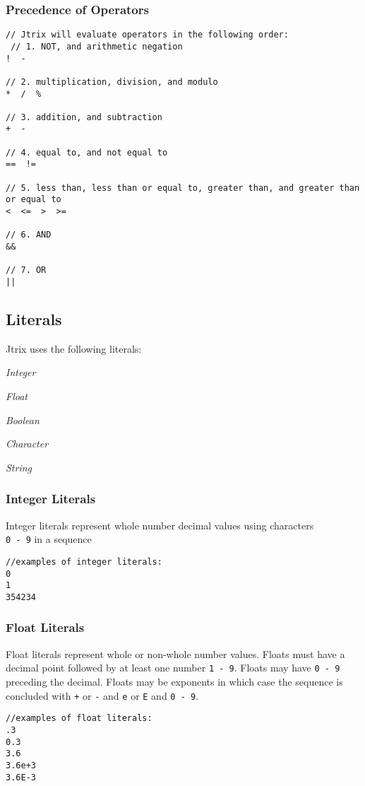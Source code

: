 \documentclass[titlepage, 12pt]{report}
\begin{document}
\subsubsection{Precedence of Operators}
\begin{lstlisting}
// Jtrix will evaluate operators in the following order:
 // 1. NOT, and arithmetic negation
!  - 

// 2. multiplication, division, and modulo
*  /  %

// 3. addition, and subtraction
+  - 

// 4. equal to, and not equal to
==  !=

// 5. less than, less than or equal to, greater than, and greater than or equal to
<  <=  >  >=

// 6. AND
&&

// 7. OR
||
\end{lstlisting}

\subsection{Literals}
Jtrix uses the following literals:

 \textit{Integer}

 \textit{Float}

 \textit{Boolean}

 \textit{Character}

 \textit{String}

\subsubsection{Integer Literals}
Integer literals represent whole number decimal values using characters \\ \texttt{0 - 9} in a sequence
\begin{lstlisting}
//examples of integer literals:
0
1
354234
\end{lstlisting}

\subsubsection{Float Literals}
Float literals represent whole or non-whole number values. Floats must have a decimal point followed by at least one number \texttt{1 - 9}. Floats may have \texttt{0 - 9} preceding the decimal. Floats may be exponents in which case the sequence is concluded with \texttt{+} or \texttt{-} and \texttt{e} or \texttt{E}  and \texttt{0 - 9}.
\begin{lstlisting}
//examples of float literals:
.3
0.3
3.6
3.6e+3
3.6E-3
\end{lstlisting}
\end{document}
